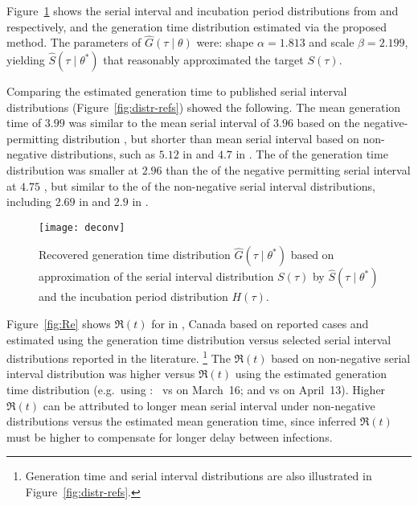 Figure~\ref{fig:deconv} shows the
serial interval and incubation period distributions
from \cite{Du2020} and \cite{Lauer2020} respectively,
and the generation time distribution estimated via the proposed method.
The \mle parameters of $\hat{G}(\tau\mid\theta)$ were:
shape ${\alpha = 1.813}$ and scale ${\beta = 2.199}$,
yielding $\hat{S}(\tau\mid\theta^*)$
that reasonably approximated the target $S(\tau)$.
\par
Comparing the estimated generation time to published serial interval distributions
(Figure~\ref{fig:distr-refs}) showed the following.
The mean generation time of $3.99$ was similar to
the mean serial interval of $3.96$
based on the negative-permitting distribution \cite{Du2020},
but shorter than mean serial interval based on non-negative distributions,
such as $5.12$ in \cite{Zhang2020} and $4.7$ in \cite{Nishiura2020}.
The \sd of the generation time distribution was smaller at $2.96$
than the \sd of the negative permitting serial interval at $4.75$ \cite{Du2020},
but similar to the \sd of the non-negative serial interval distributions,
including $2.69$ in \cite{Zhang2020} and $2.9$ in \cite{Nishiura2020}.
\par
\begin{figure}
  \centering
  \texttt{[image: deconv]}
  \caption{Recovered generation time distribution
    $\hat{G}(\tau\mid\theta^*)$
    based on \mle approximation of the serial interval distribution
    $S(\tau)$ by $\hat{S}(\tau\mid\theta^*)$
    and the incubation period distribution $H(\tau)$.}
  \label{fig:deconv}
\end{figure}
\par
Figure~\ref{fig:Re} shows
$\Re(t)$ for \covid in \gta, Canada
based on reported cases and estimated using
the generation time distribution versus
selected serial interval distributions reported in the literature.%
\footnote{Generation time and serial interval distributions
  are also illustrated in Figure~\ref{fig:distr-refs}.}
The $\Re(t)$ based on non-negative serial interval distribution was higher
versus $\Re(t)$ using the estimated generation time distribution
(e.g.\ using \cite{Zhang2020}:\
 vs
 on March~16; and
 vs
 on April~13).
Higher $\Re(t)$ can be attributed to
longer mean serial interval under non-negative distributions
versus the estimated mean generation time,
since inferred $\Re(t)$ must be higher
to compensate for longer delay between infections.%
